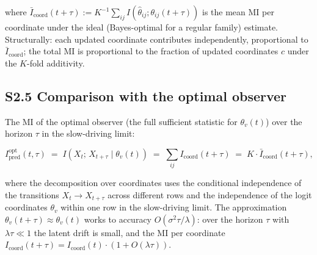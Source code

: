 \documentclass[pdflatex,sn-mathphys-ay]{sn-jnl}
\begin{document}
where \(\bar I_{\text{coord}}(t+\tau) := K^{-1} \sum_{ij} I(\hat\theta_{ij}; \theta_{ij}(t+\tau))\) is the mean MI per coordinate under the ideal (Bayes-optimal for a regular family) estimate. Structurally: each updated coordinate contributes independently, proportional to \(\bar I_{\text{coord}}\); the total MI is proportional to the fraction of updated coordinates \(c\) under the \(K\)-fold additivity.



\subsection*{S2.5 Comparison with the optimal observer}\label{s2.5-comparison-with-the-optimal-observer}



The MI of the optimal observer (the full sufficient statistic for \(\theta_v(t)\)) over the horizon \(\tau\) in the slow-driving limit:



\begin{equation}I_{\text{pred}}^{\text{opt}}(t, \tau) \;=\; I(X_t;\, X_{t+\tau} \mid \theta_v(t)) \;=\; \sum_{ij} I_{\text{coord}}(t+\tau) \;=\; K \cdot \bar I_{\text{coord}}(t+\tau), \tag{S2.4}\end{equation}



where the decomposition over coordinates uses the conditional independence of the transitions \(X_t \to X_{t+\tau}\) across different rows and the independence of the logit coordinates \(\theta_v\) within one row in the slow-driving limit. The approximation \(\theta_v(t+\tau) \approx \theta_v(t)\) works to accuracy \(O(\sigma^2 \tau /\lambda)\): over the horizon \(\tau\) with \(\lambda \tau \ll 1\) the latent drift is small, and the MI per coordinate \(I_{\text{coord}}(t+\tau) = I_{\text{coord}}(t) \cdot (1 + O(\lambda \tau))\).
\end{document}
